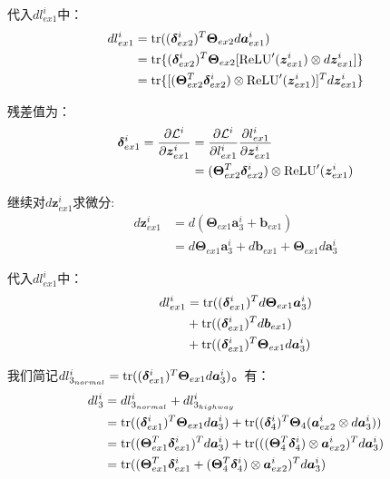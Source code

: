 \documentclass[12pt, a4paper]{article}
\newcommand{\imat}{\bm}
\newcommand{\ivec}{\bm}
\newcommand{\tr}{{\rm tr}}
\newcommand{\relu}{{\rm ReLU}}
\newcommand{\loss}{\mathcal{L}}
\newcommand{\thetam}{\imat{\Theta}}
\newcommand{\deltav}{\ivec{\delta}}
\newcommand{\av}{\ivec{a}}
\newcommand{\bv}{\ivec{b}}
\newcommand{\zv}{\ivec{z}}
\begin{document}
\begin{enumerate}
            代入$d l_{ex1}^i$中：
            \begin{align*}
            d l_{ex1}^i
            &= \tr((\deltav_{ex2}^i)^T \thetam_{ex2} d \av_{ex1}^i) \\
            &= \tr\{(\deltav_{ex2}^i)^T \thetam_{ex2} [\relu^{\prime}(\zv_{ex1}^i) \otimes d \zv_{ex1}^i]\} \\
            &= \tr\{[(\thetam_{ex2}^T \deltav_{ex2}^i) \otimes \relu^{\prime}(\zv_{ex1}^i)]^T d \zv_{ex1}^i\}
            \end{align*}

            残差值为：
            \begin{equation}\begin{aligned}
            \deltav_{ex1}^i = \frac{\partial \loss^i}{\partial \zv_{ex1}^i}
            &= \frac{\partial \loss^i}{\partial l_{ex1}^i} \frac{\partial l_{ex1}^i}{\partial \zv_{ex1}^i} \\
            &= (\thetam_{ex2}^T \deltav_{ex2}^i) \otimes \relu^{\prime}(\zv_{ex1}^i)
            \end{aligned}\end{equation}

            继续对$d \zv_{ex1}^i$求微分:
            \begin{align*}
            d \zv_{ex1}^i
            &= d (\thetam_{ex1} \av_3^i + \bv_{ex1}) \\
            &= d \thetam_{ex1} \av_3^i + d \bv_{ex1} + \thetam_{ex1} d \av_3^i
            \end{align*}

            代入$d l_{ex1}^i$中：
            \begin{align*}
            d l_{ex1}^i &= \tr((\deltav_{ex1}^i)^T d \thetam_{ex1} \av_3^i) \\
                        &+ \tr((\deltav_{ex1}^i)^T d \bv_{ex1}) \\
                        &+ \tr((\deltav_{ex1}^i)^T \thetam_{ex1} d \av_3^i)
            \end{align*}

            我们简记$d l_{3_{normal}}^i = \tr((\deltav_{ex1}^i)^T \thetam_{ex1} d \av_3^i)$。有：
            \begin{align*}
            d l_3^i
            &= d l_{3_{normal}}^i + d l_{3_{highway}}^i \\
            &= \tr((\deltav_{ex1}^i)^T \thetam_{ex1} d \av_3^i) + \tr((\deltav_4^i)^T \thetam_4 (\av_{ex2}^i \otimes d \av_3^i)) \\
            &= \tr((\thetam_{ex1}^T \deltav_{ex1}^i)^T d \av_3^i) + \tr(((\thetam_4^T \deltav_4^i) \otimes \av_{ex2}^i)^T d \av_3^i) \\
            &= \tr((\thetam_{ex1}^T \deltav_{ex1}^i + (\thetam_4^T \deltav_4^i) \otimes \av_{ex2}^i)^T d \av_3^i)
            \end{align*}


\end{enumerate}
\end{document}
